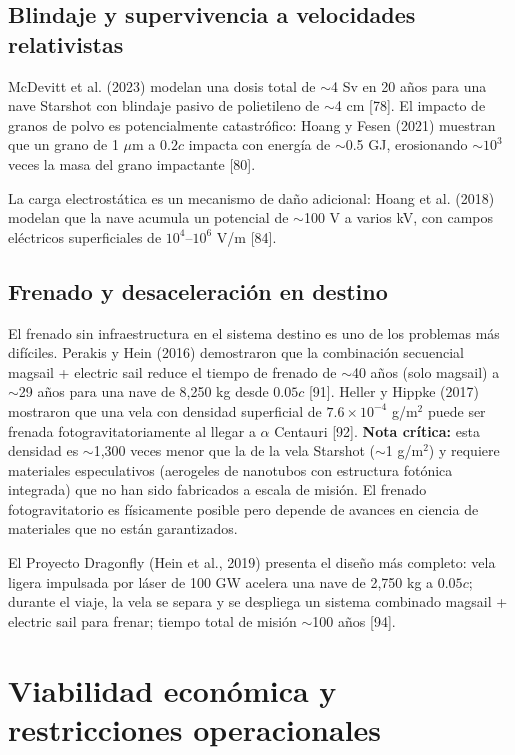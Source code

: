 \documentclass[11pt,a4paper,onecolumn]{article}
\begin{document}
\subsection{Blindaje y supervivencia a velocidades relativistas}

McDevitt et al. (2023) modelan una dosis total de $\sim$4 Sv en 20 años para una nave Starshot con blindaje pasivo de polietileno de $\sim$4 cm [78]. El impacto de granos de polvo es potencialmente catastrófico: Hoang y Fesen (2021) muestran que un grano de 1 $\mu$m a $0.2c$ impacta con energía de $\sim$0.5 GJ, erosionando $\sim10^3$ veces la masa del grano impactante [80].

La carga electrostática es un mecanismo de daño adicional: Hoang et al. (2018) modelan que la nave acumula un potencial de $\sim$100 V a varios kV, con campos eléctricos superficiales de $10^4$--$10^6$ V/m [84].

\subsection{Frenado y desaceleración en destino}

El frenado sin infraestructura en el sistema destino es uno de los problemas más difíciles. Perakis y Hein (2016) demostraron que la combinación secuencial magsail + electric sail reduce el tiempo de frenado de $\sim$40 años (solo magsail) a $\sim$29 años para una nave de 8,250 kg desde $0.05c$ [91]. Heller y Hippke (2017) mostraron que una vela con densidad superficial de $7.6\times10^{-4}$ g/m$^2$ puede ser frenada fotogravitatoriamente al llegar a $\alpha$ Centauri [92]. \textbf{Nota crítica:} esta densidad es $\sim$1,300 veces menor que la de la vela Starshot ($\sim$1 g/m$^2$) y requiere materiales especulativos (aerogeles de nanotubos con estructura fotónica integrada) que no han sido fabricados a escala de misión. El frenado fotogravitatorio es físicamente posible pero depende de avances en ciencia de materiales que no están garantizados.

El Proyecto Dragonfly (Hein et al., 2019) presenta el diseño más completo: vela ligera impulsada por láser de 100 GW acelera una nave de 2,750 kg a $0.05c$; durante el viaje, la vela se separa y se despliega un sistema combinado magsail + electric sail para frenar; tiempo total de misión $\sim$100 años [94].

\section{Viabilidad económica y restricciones operacionales}
\end{document}
